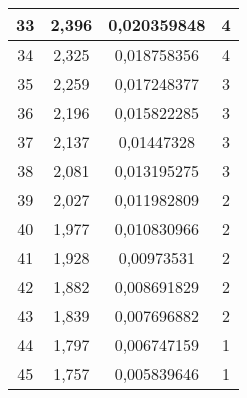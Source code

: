 \begin{table}[h]
\begin{tabular}{|c|c|c|c|}
33                                      & 2,396                               & 0,020359848                          & 4                                        \\ \hline
34                                      & 2,325                               & 0,018758356                          & 4                                        \\ \hline
35                                      & 2,259                               & 0,017248377                          & 3                                        \\ \hline
36                                      & 2,196                               & 0,015822285                          & 3                                        \\ \hline
37                                      & 2,137                               & 0,01447328                           & 3                                        \\ \hline
38                                      & 2,081                               & 0,013195275                          & 3                                        \\ \hline
39                                      & 2,027                               & 0,011982809                          & 2                                        \\ \hline
40                                      & 1,977                               & 0,010830966                          & 2                                        \\ \hline
41                                      & 1,928                               & 0,00973531                           & 2                                        \\ \hline
42                                      & 1,882                               & 0,008691829                          & 2                                        \\ \hline
43                                      & 1,839                               & 0,007696882                          & 2                                        \\ \hline
44                                      & 1,797                               & 0,006747159                          & 1                                        \\ \hline
45                                      & 1,757                               & 0,005839646                          & 1                                        \\ \hline

\end{tabular}
\end{table}
